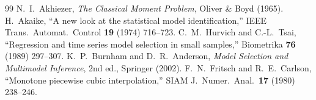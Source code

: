 \documentclass[11pt,a4paper]{article}
\theoremstyle{definition}
\theoremstyle{remark}
\begin{document}
\begin{thebibliography}{99}
 N.~I.~Akhiezer, \emph{The Classical Moment Problem}, Oliver \& Boyd (1965).
 H.~Akaike, ``A new look at the statistical model identification,'' IEEE Trans.\ Automat.\ Control \textbf{19} (1974) 716--723.
 C.~M.~Hurvich and C.-L.~Tsai, ``Regression and time series model selection in small samples,'' Biometrika \textbf{76} (1989) 297--307.
 K.~P.~Burnham and D.~R.~Anderson, \emph{Model Selection and Multimodel Inference}, 2nd ed., Springer (2002).
 F.~N.~Fritsch and R.~E.~Carlson, ``Monotone piecewise cubic interpolation,'' SIAM J.\ Numer.\ Anal.\ \textbf{17} (1980) 238--246.
\end{thebibliography}
\end{document}
